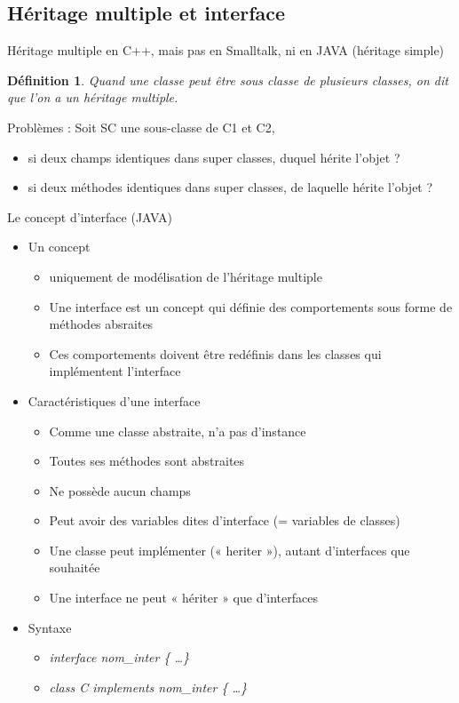 \documentclass{article}
\newtheorem{definition}{Définition}
\begin{document}
\subsection{Héritage multiple et interface}

Héritage multiple en C++, mais pas en Smalltalk, ni en JAVA (héritage simple)

\begin{definition}
	Quand une classe peut être sous classe de plusieurs
classes, on dit que l'on a un héritage multiple.
\end{definition}

Problèmes : Soit SC une sous-classe de C1 et C2,
\begin{itemize}
	\item si deux champs identiques dans super classes, duquel hérite
l'objet ?
	\item si deux méthodes identiques dans super classes, de laquelle
hérite l'objet ?
\end{itemize}

Le concept d'interface (JAVA)

\begin{itemize}
	\item Un concept
	\begin{itemize}
		\item uniquement de modélisation de l’héritage multiple
		\item Une interface est un concept qui définie des comportements sous forme de
méthodes absraites
		\item Ces comportements doivent être redéfinis dans les classes qui implémentent
l’interface
	\end{itemize}
	\item Caractéristiques d’une interface
	\begin{itemize}
		\item Comme une classe abstraite, n’a pas d’instance
		\item Toutes ses méthodes sont abstraites
		\item Ne possède aucun champs
		\item Peut avoir des variables dites d’interface (= variables de classes)
		\item Une classe peut implémenter (« heriter »), autant d’interfaces que souhaitée
		\item Une interface ne peut « hériter » que d'interfaces
	\end{itemize}
	\item Syntaxe
	\begin{itemize}
		\item \emph{interface nom\_inter \{ \dots \} }
		\item \emph{class C implements nom\_inter \{ \dots \}}
	\end{itemize}
\end{itemize}
\end{document}
